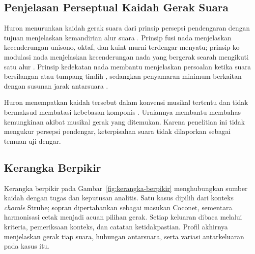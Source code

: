 \subsection{Penjelasan Perseptual Kaidah Gerak Suara}\label{sec:teori-huron}

Huron menurunkan kaidah gerak suara dari prinsip persepsi pendengaran dengan tujuan menjelaskan kemandirian alur suara \parencite[2--5]{huron2001}. Prinsip fusi nada menjelaskan kecenderungan unisono, oktaf, dan kuint murni terdengar menyatu; prinsip ko-modulasi nada menjelaskan kecenderungan nada yang bergerak searah mengikuti satu alur \parencite[19, 31, 37]{huron2001}. Prinsip kedekatan nada membantu menjelaskan persoalan ketika suara bersilangan atau tumpang tindih \parencite[24, 35]{huron2001}, sedangkan penyamaran minimum berkaitan dengan susunan jarak antarsuara \parencite[18, 33]{huron2001}.

Huron menempatkan kaidah tersebut dalam konvensi musikal tertentu dan tidak bermaksud membatasi kebebasan komponis \parencite[2, 4]{huron2001}. Uraiannya membantu membahas kemungkinan akibat musikal gerak yang ditemukan. Karena penelitian ini tidak mengukur persepsi pendengar, keterpisahan suara tidak dilaporkan sebagai temuan uji dengar.

\subsection{Kerangka Berpikir}\label{sec:kerangka-berpikir}

Kerangka berpikir pada Gambar~\ref{fig:kerangka-berpikir} menghubungkan sumber kaidah dengan tugas dan keputusan analitis. Satu kasus dipilih dari konteks \textit{chorale} Strube; sopran dipertahankan sebagai masukan Coconet, sementara harmonisasi cetak menjadi acuan pilihan gerak. Setiap keluaran dibaca melalui kriteria, pemeriksaan konteks, dan catatan ketidakpastian. Profil akhirnya menjelaskan gerak tiap suara, hubungan antarsuara, serta variasi antarkeluaran pada kasus itu.

